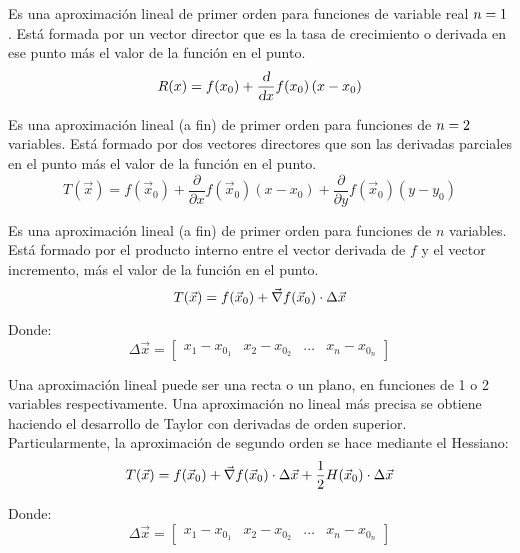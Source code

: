 \documentclass[a5paper,12pt,twoside]{book}
\begin{document}
Es una aproximación lineal de primer orden para funciones de variable real $n=1$.
Está formada por un vector director que es la tasa de crecimiento o derivada en ese punto más el valor de la función en el punto.
\begin{equation*}
    R(x) = f(x_0) + \frac{\textsl{d}}{\textsl{d} x} f(x_0) \left( x-x_0 \right)
\end{equation*}


Es una aproximación lineal (a fin) de primer orden para funciones de $n=2$ variables.
Está formado por dos vectores directores que son las derivadas parciales en el punto más el valor de la función en el punto.
\begin{equation*}
    T(\Vec{x}) = f(\Vec{x}_0) + \frac{\partial}{\partial x} f(\Vec{x}_0) \left(x-x_0\right) + \frac{\partial}{\partial y} f(\Vec{x}_0) \left(y-y_0\right)
\end{equation*}


Es una aproximación lineal (a fin) de primer orden para funciones de $n$ variables.
Está formado por el producto interno entre el vector derivada de $f$ y el vector incremento, más el valor de la función en el punto.
\begin{equation*}
    T(\Vec{x}) = f(\Vec{x}_0) + \Vec{\nabla} f(\Vec{x}_0) \cdot \Delta \Vec{x}
\end{equation*}

Donde:
\begin{equation*}
    \Delta \Vec{x} = \begin{bmatrix} x_1-x_{0_1} & x_2-x_{0_2} & \dots & x_n-x_{0_n} \end{bmatrix}
\end{equation*}


Una aproximación lineal puede ser una recta o un plano, en funciones de 1 o 2 variables respectivamente.
Una aproximación no lineal más precisa se obtiene haciendo el desarrollo de Taylor con derivadas de orden superior.
Particularmente, la aproximación de segundo orden se hace mediante el Hessiano:
\begin{equation*}
    T(\Vec{x}) = f(\Vec{x}_0) + \Vec{\nabla} f(\Vec{x}_0) \cdot \Delta \Vec{x} + \frac{1}{2} H(\Vec{x}_0) \cdot \Delta \Vec{x}
\end{equation*}

Donde:
\begin{equation*}
    \Delta \Vec{x} = \begin{bmatrix} x_1-x_{0_1} & x_2-x_{0_2} & \dots & x_n-x_{0_n} \end{bmatrix}
\end{equation*}
\end{document}
